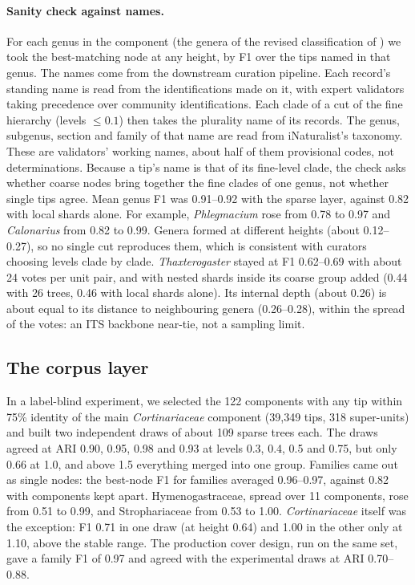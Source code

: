 \documentclass[11pt,a4paper]{article}
\begin{document}
\paragraph{Sanity check against names.}
For each genus in the component (the genera of the revised classification of
\citet{liimatainen2022cortinariaceae}) we took the best-matching node at any height, by F1 over the
tips named in that genus. The names come from the downstream curation pipeline. Each record's
standing name is read from the identifications made on it, with expert validators taking precedence
over community identifications. Each clade of a cut of the fine hierarchy (levels $\le 0.1$) then
takes the plurality name of its records. The genus, subgenus, section and family of that name are
read from iNaturalist's taxonomy. These are validators' working names, about half of them provisional
codes, not determinations. Because a tip's name is that of its fine-level clade, the check asks
whether coarse nodes bring together the fine clades of one genus, not whether single tips agree.
Mean genus F1
was 0.91--0.92 with the sparse layer, against 0.82 with local shards alone. For example,
\emph{Phlegmacium} rose from 0.78 to 0.97 and \emph{Calonarius} from 0.82 to 0.99. Genera formed at
different heights (about 0.12--0.27), so no single cut reproduces them, which is consistent with
curators choosing levels clade by clade. \emph{Thaxterogaster} stayed at F1 0.62--0.69 with about 24 votes
per unit pair, and with nested shards inside its coarse group added (0.44 with 26 trees, 0.46 with
local shards alone). Its
internal depth (about 0.26) is about equal to its distance to neighbouring genera (0.26--0.28),
within the spread of the votes: an ITS backbone near-tie, not a sampling limit.

\subsection{The corpus layer}\label{sec:res-corpus}

In a label-blind experiment, we selected the 122 components with any tip within 75\% identity of
the main \emph{Cortinariaceae} component (39,349 tips, 318 super-units) and built two independent
draws of about 109 sparse trees each. The draws agreed at ARI 0.90, 0.95, 0.98 and 0.93 at levels
0.3, 0.4, 0.5 and 0.75, but only 0.66 at 1.0, and above 1.5 everything merged into one group.
Families came out as single nodes: the best-node F1 for families averaged 0.96--0.97, against 0.82
with components kept apart. Hymenogastraceae, spread over 11 components, rose from 0.51 to 0.99, and
Strophariaceae from 0.53 to 1.00. \emph{Cortinariaceae} itself was the exception: F1 0.71 in one draw (at
height 0.64) and 1.00 in the other only at 1.10, above the stable range. The production cover design, run on the same set, gave a
family F1 of 0.97 and agreed with the experimental draws at ARI 0.70--0.88.
\end{document}
